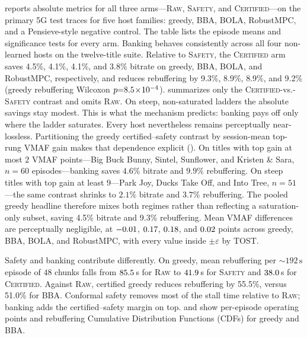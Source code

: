  reports absolute metrics for all three arms---\textsc{Raw}, \textsc{Safety}, and \textsc{Certified}---on the primary \mbox{5G} test traces for five host families: greedy, BBA, BOLA, RobustMPC, and a Pensieve-style negative control.
The table lists the episode means and significance tests for every arm.
Banking behaves consistently across all four non-learned hosts on the twelve-title suite. Relative to \textsc{Safety}, the \textsc{Certified} arm saves 4.5\%, 4.1\%, 4.1\%, and 3.8\% bitrate on greedy, BBA, BOLA, and RobustMPC, respectively, and reduces rebuffering by 9.3\%, 8.9\%, 8.9\%, and 9.2\% (greedy rebuffering Wilcoxon \(p{=}8.5\!\times\!10^{-4}\)).
 summarizes only the \textsc{Certified}-vs.-\textsc{Safety} contrast and omits \textsc{Raw}.
On steep, non-saturated ladders the absolute savings stay modest. This is what the mechanism predicts: banking pays off only where the ladder saturates. Every host nevertheless remains perceptually near-lossless.
Partitioning the greedy certified--safety contrast by session-mean top-rung VMAF gain makes that dependence explicit (). On titles with top gain at most \(2\) VMAF points---Big Buck Bunny, Sintel, Sunflower, and Kristen \& Sara, \(n{=}60\) episodes---banking saves \(4.6\%\) bitrate and \(9.9\%\) rebuffering. On steep titles with top gain at least \(9\)---Park Joy, Ducks Take Off, and Into Tree, \(n{=}51\)---the same contrast shrinks to \(2.1\%\) bitrate and \(3.7\%\) rebuffering. The pooled greedy headline therefore mixes both regimes rather than reflecting a saturation-only subset, saving 4.5\% bitrate and 9.3\% rebuffering.
Mean VMAF differences are perceptually negligible, at \(-0.01\), \(0.17\), \(0.18\), and \(0.02\) points across greedy, BBA, BOLA, and RobustMPC, with every value inside \(\pm\varepsilon\) by TOST.


Safety and banking contribute differently. On greedy, mean rebuffering per \(\sim\!192\,\mathrm{s}\) episode of \(48\) chunks falls from \(85.5\)\,s for \textsc{Raw} to \(41.9\)\,s for \textsc{Safety} and \(38.0\)\,s for \textsc{Certified}. Against \textsc{Raw}, certified greedy reduces rebuffering by 55.5\%, versus 51.0\% for BBA. Conformal safety removes most of the stall time relative to \textsc{Raw}; banking adds the certified--safety margin on top.
 and  show per-episode operating points and rebuffering Cumulative Distribution Functions (CDFs) for greedy and BBA.


